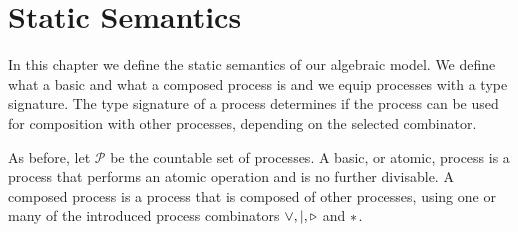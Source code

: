 





\section{Static Semantics}
\label{chp:static_semantics}
In this chapter we define the static semantics of our algebraic model. We define what a basic and what a composed process is and we equip processes with a type signature. The type signature of a process determines if the process can be used for composition with other processes, depending on the selected combinator.

As before, let $\mathcal{P}$ be the countable set of processes. A basic, or atomic, process is a process that performs an atomic operation and is no further divisable. A composed process is a process that is composed of other processes, using one or many of the introduced process combinators $\vee, |, \triangleright$ and $*$.

